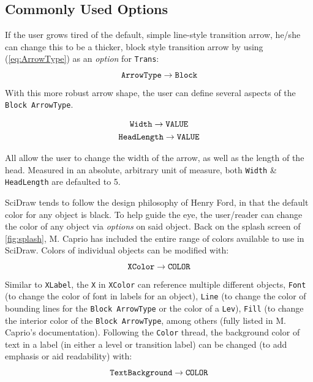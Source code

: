 \documentclass[portrait,10pt]{article}
\begin{document}
\subsection{Commonly Used Options}
If the user grows tired of the default, simple line-style transition arrow, he/she can change this to be a thicker, block style transition arrow by using (\ref{eq:ArrowType}) as an \textit{option} for {\tt Trans}:
\begin{equation}\label{eq:ArrowType}
{\tt ArrowType\rightarrow Block}
\end{equation}
With this more robust arrow shape, the user can define several aspects of the {\tt Block ArrowType}. 

\begin{gather*}\label{eq:width}
{\tt Width\rightarrow VALUE}\\
{\tt HeadLength\rightarrow VALUE}
\end{gather*}


All allow the user to change the width of the arrow, as well as the length of the head. Measured in an absolute, arbitrary unit of measure, both {\tt Width} \& {\tt HeadLength} are defaulted to 5. 

SciDraw tends to follow the design philosophy of Henry Ford, in that the default color for any object is black. To help guide the eye, the user/reader can change the color of any object via \textit{options} on said object. Back on the splash screen of \ref{fig:splash}, M. Caprio has included the entire range of colors available to use in SciDraw. Colors of individual objects can be modified with:
\begin{equation}\label{eq:colors}
{\tt XColor\rightarrow COLOR}
\end{equation}
Similar to {\tt XLabel}, the {\tt X} in {\tt XColor} can reference multiple different objects, {\tt Font} (to change the color of font in labels for an object), {\tt Line} (to change the color of bounding lines for the {\tt Block ArrowType} or the color of a {\tt Lev}), {\tt Fill} (to change the interior color of the {\tt Block ArrowType}, among others (fully listed in M. Caprio's documentation). Following the {\tt Color} thread, the background color of text in a label (in either a level or transition label) can be changed (to add emphasis or aid readability) with:
\begin{equation}\label{eq:BackgroundColor}
{\tt TextBackground\rightarrow COLOR}
\end{equation}
\end{document}
